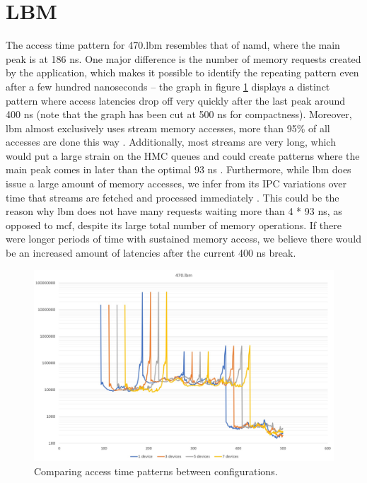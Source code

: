 \section{LBM}
The access time pattern for 470.lbm resembles that of namd, where the main peak is at 186 ns. One major difference is the number of memory requests created by the application, which makes it possible to identify the repeating pattern even after a few hundred nanoseconds -- the graph in figure \ref{Memory-access-470} displays a distinct pattern where access latencies drop off very quickly after the last peak around 400 ns (note that the graph has been cut at 500 ns for compactness). Moreover, lbm almost exclusively uses stream memory accesses, more than 95\% of all accesses are done this way \cite{10.1145/3307650.3322229}. Additionally, most streams are very long, which would put a large strain on the HMC queues and could create patterns where the main peak comes in later than the optimal 93 ns \cite{8366939}. Furthermore, while lbm does issue a large amount of memory accesses, we infer from its IPC variations over time that streams are fetched and processed immediately \cite{song2018experiments}. This could be the reason why lbm does not have many requests waiting more than 4 * 93 ns, as opposed to mcf, despite its large total number of memory operations. If there were longer periods of time with sustained memory access, we believe there would be an increased amount of latencies after the current 400 ns break. 
\bigskip

\begin{figure}[!ht]
    \centering
    \includegraphics[width=1.0\linewidth]{figure/470-x_4.jpg}
    \caption{Comparing access time patterns between configurations.}
    \label{Memory-access-470}
\end{figure}


